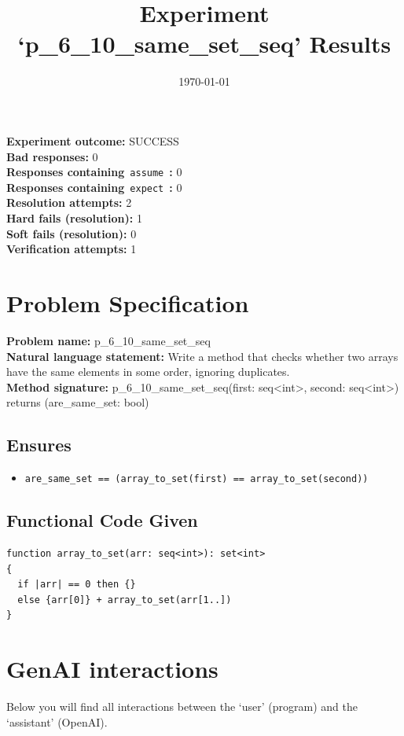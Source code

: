 \documentclass{article}
\begin{document}
\title{Experiment `p\_6\_10\_same\_set\_seq' Results}
\author{\today}
\date{}
\maketitle
\textbf{Experiment outcome: }SUCCESS
\\\textbf{Bad responses: }0
\\\textbf{Responses containing}~\texttt{assume}~\textbf{: }0
\\\textbf{Responses containing}~\texttt{expect}~\textbf{: }0
\\\textbf{Resolution attempts: }2
\\\textbf{Hard fails (resolution): }1
\\\textbf{Soft fails (resolution): }0
\\\textbf{Verification attempts: }1
\section*{Problem Specification}
\textbf{Problem name: }p\_6\_10\_same\_set\_seq
\\\textbf{Natural language statement: }Write a method that checks whether two arrays have the same elements in some order, ignoring duplicates.
\\\textbf{Method signature: }p\_6\_10\_same\_set\_seq(first: seq<int>, second: seq<int>) returns (are\_same\_set: bool)
\subsection*{Ensures}
\begin{itemize}
\item \texttt{are\_same\_set == (array\_to\_set(first) == array\_to\_set(second))}
\end{itemize}
\subsection*{Functional Code Given}
\begin{lstlisting}
function array_to_set(arr: seq<int>): set<int>
{
  if |arr| == 0 then {}
  else {arr[0]} + array_to_set(arr[1..])
}
\end{lstlisting}
\clearpage
\section*{GenAI interactions}
Below you will find all interactions between the `user' (program) and the `assistant' (OpenAI).
\end{document}
